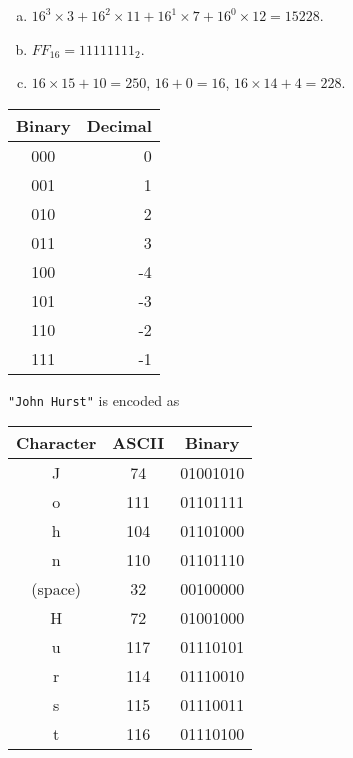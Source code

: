 \documentclass[12pt]{extarticle}
\begin{document}
\begin{enumerate}[(a)]
\item $16^3\times 3 + 16^2\times 11 + 16^1\times 7 + 16^0\times 12 = 15228$.
\item $FF_{16} = 11111111_2$.
\item $16\times 15 + 10 = 250$, $16 + 0 = 16$, $16\times 14 + 4 = 228$.
\end{enumerate}

\begin{center}
\begin{tabular}{|c|r|}
    \hline
    Binary & Decimal \\
    \hline
    000 & 0 \\
    001 & 1 \\
    010 & 2 \\
    011 & 3 \\
    100 & -4 \\
    101 & -3 \\
    110 & -2 \\
    111 & -1 \\
    \hline
\end{tabular}
\end{center}


\texttt{"John Hurst"} is encoded as
\begin{center}
\begin{tabular}{|c|c|c|}
    \hline
    Character & ASCII & Binary \\
    \hline
    J & 74 & 01001010 \\
    o & 111 & 01101111 \\
    h & 104 & 01101000 \\
    n & 110 & 01101110 \\
    (space) & 32 & 00100000 \\
    H & 72 & 01001000 \\
    u & 117 & 01110101 \\
    r & 114 & 01110010 \\
    s & 115 & 01110011 \\
    t & 116 & 01110100 \\
    \hline
\end{tabular}
\end{center}
\end{document}
